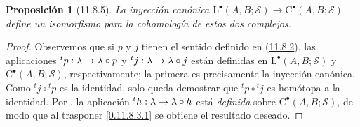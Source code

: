 \documentclass[10pt,oneside,openany]{book}
\theoremstyle{egaenv}\newtheorem*{env}{---}
\theoremstyle{egastatement}
\newtheorem*{proposition}{Proposición}
\theoremstyle{egadescription}
\renewcommand{\to}{\mathchoice{\longrightarrow}{\rightarrow}{\rightarrow}{\rightarrow}}
\begin{document}
\begin{proposition}[11.8.5]
\label{0.11.8.5-fr}
{La inyección canónica
$\mathrm L^\bullet(A,B;\mathscr S)\longrightarrow\mathrm C^\bullet(A,B;\mathscr S)$
define un isomorfismo para la cohomología de estos dos complejos.}
\end{proposition}

\begin{proof}
Observemos que si $p$ y $j$ tienen el sentido definido en (\hyperref[0.11.8.2-fr]{11.8.2}), las aplicaciones ${}^tp:\lambda\to\lambda\circ p$ y ${}^tj:\lambda\to\lambda\circ j$ están definidas en $\mathrm L^\bullet(A,B;\mathscr S)$ y
$\mathrm C^\bullet(A,B;\mathscr S)$, respectivamente; la primera es precisamente
la inyección canónica.
Como ${}^tj\circ{}^tp$ es la identidad, solo queda demostrar
que ${}^tp\circ{}^tj$ es homótopa a la identidad.
Por , la aplicación
${}^th:\lambda\to\lambda\circ h$
está \emph{definida} sobre $\mathrm C^\bullet(A,B;\mathscr S)$, de modo que al trasponer
\eqref{0.11.8.3.1} se obtiene el resultado deseado.
\end{proof}
\end{document}
